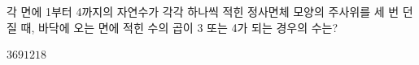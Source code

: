 각 면에 1부터 4까지의 자연수가 각각 하나씩 적힌 정사면체 모양의 주사위를 세 번 던질 때, 바닥에 오는 면에 적힌 수의 곱이 3 또는 4가 되는 경우의 수는?
\begin{choices32}{$3$}{$6$}{$9$}{$12$}{$18$}\end{choices32}
